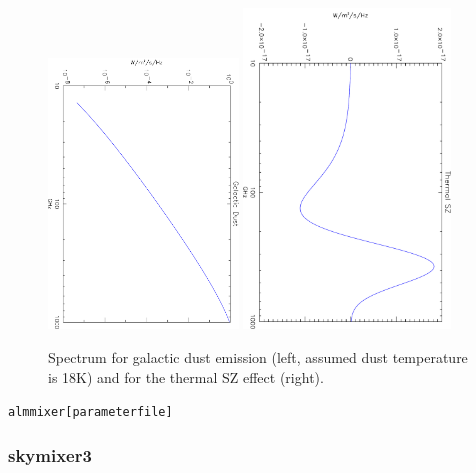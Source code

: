\begin{figure}[t]
  \begin{center}
    \includegraphics[angle=90,width=0.45\textwidth]{spec_gs.pdf}\hfill
    \includegraphics[angle=90,width=0.49\textwidth]{spec_sz.pdf}
  \end{center}
\caption{Spectrum for galactic dust emission (left, assumed dust temperature
  is 18K) and for the thermal SZ effect (right).\label{spec}}
\end{figure}

\begin{alltt}
almmixer [parameter file]


\end{alltt}

\subsubsection{skymixer3}

